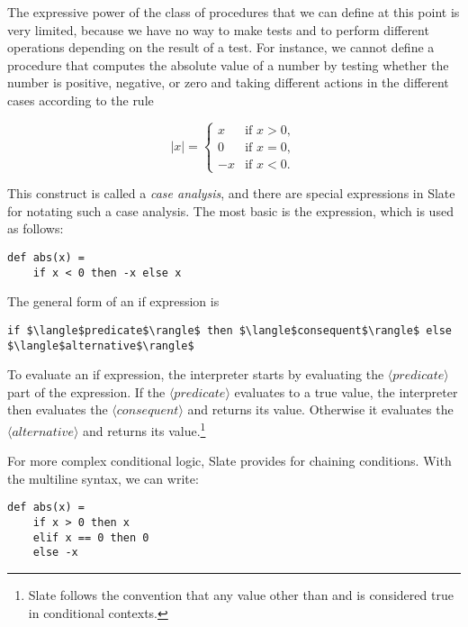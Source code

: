 The expressive power of the class of procedures that we can define at this point is very limited, because we have no way to make tests and to perform different operations depending on the result of a test. For instance, we cannot define a procedure that computes the absolute value of a number by testing whether the number is positive, negative, or zero and taking different actions in the different cases according to the rule

\begin{equation}
|x| = \begin{cases}
x & \text{if } x > 0, \\
0 & \text{if } x = 0, \\
-x & \text{if } x < 0.
\end{cases}
\end{equation}

This construct is called a \textit{case analysis}, and there are special expressions in Slate for notating such a case analysis. The most basic is the  expression, which is used as follows:

\begin{lstlisting}
def abs(x) =
    if x < 0 then -x else x
\end{lstlisting}

The general form of an if expression is

\begin{lstlisting}[style=plain]
if $\langle$predicate$\rangle$ then $\langle$consequent$\rangle$ else $\langle$alternative$\rangle$
\end{lstlisting}

To evaluate an if expression, the interpreter starts by evaluating the $\langle\textit{predicate}\rangle$ part of the expression. If the $\langle\textit{predicate}\rangle$ evaluates to a true value, the interpreter then evaluates the $\langle\textit{consequent}\rangle$ and returns its value. Otherwise it evaluates the $\langle\textit{alternative}\rangle$ and returns its value.\footnote{Slate follows the convention that any value other than  and  is considered true in conditional contexts.}

For more complex conditional logic, Slate provides  for chaining conditions. With the multiline syntax, we can write:

\begin{lstlisting}
def abs(x) =
    if x > 0 then x
    elif x == 0 then 0
    else -x
\end{lstlisting}

